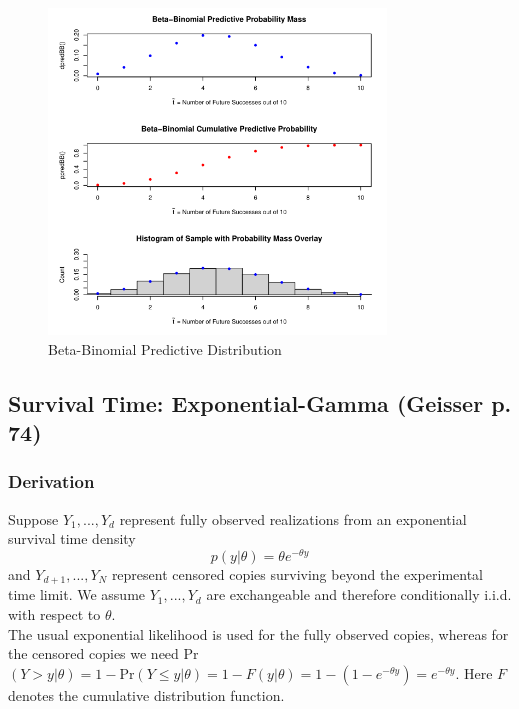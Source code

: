 \documentclass[12pt, a4paper]{article}
\begin{document}
\begin{figure}[ht]
  \centering
  \includegraphics[width=0.8\textwidth]{./Graphics/DistributionPlots/BetaBinomial}
  \caption{Beta-Binomial Predictive Distribution}
  \label{fig:BBdist}
\end{figure}

\vspace{2cm}




    \subsection{Survival Time:  Exponential-Gamma (Geisser p. 74)}

    \subsubsection{Derivation}

Suppose $Y_1,...,Y_d$ represent fully observed realizations from an exponential survival time density
          $$p(y|\theta) = \theta e^{-\theta y}$$
      and $Y_{d+1},...,Y_N$ represent censored copies surviving beyond the experimental time limit.  We assume $Y_1,...,Y_d$ are exchangeable and therefore conditionally i.i.d. with respect to $\theta$.\\

\noindent The usual exponential likelihood is used for the fully observed copies, whereas for the censored copies we need Pr$(Y > y | \theta) = 1 - \text{Pr}(Y\leq y | \theta) = 1 - F(y|\theta) = 1 - (1 - e^{-\theta y}) = e^{-\theta y}$.  Here $F$ denotes the cumulative distribution function.\\
\end{document}
